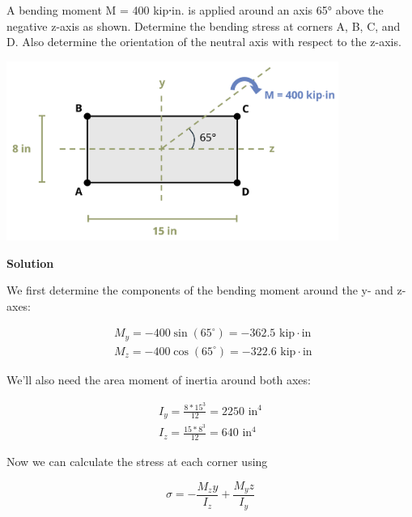 \documentclass[
  letterpaper,
  DIV=11,
  numbers=noendperiod]{scrreprt}
\begin{document}
\begin{tcolorbox}[enhanced jigsaw, colbacktitle=quarto-callout-note-color!10!white, title={Example 9.5: Unsymmetric Bending\,}, coltitle=black, leftrule=.75mm, rightrule=.15mm, opacityback=0, breakable, colframe=quarto-callout-note-color-frame, left=2mm, arc=.35mm, colback=white, bottomrule=.15mm, bottomtitle=1mm, toptitle=1mm, titlerule=0mm, opacitybacktitle=0.6, toprule=.15mm]

A bending moment M = 400 kip⸱in. is applied around an axis 65° above the
negative z-axis as shown. Determine the bending stress at corners A, B,
C, and D. Also determine the orientation of the neutral axis with
respect to the z-axis.

\begin{center}
\includegraphics[width=4.27083in,height=\textheight]{images/CH9 PNGs/Example 9.5 part 1.png}
\end{center}

\textbf{Solution}

We first determine the components of the bending moment around the y-
and z-axes:

\[
\begin{aligned}
& M_y=-400 \sin \left(65^{\circ}\right)=-362.5 \text{ kip} \cdot \text {in } \\
& M_z=-400 \cos \left(65^{\circ}\right)=-322.6 \text{ kip} \cdot \text {in }
\end{aligned}
\]

We'll also need the area moment of inertia around both axes:

\[
\begin{gathered}
I_y=\frac{8 * 15^3}{12}=2250 \text{ in}^4 \\
I_z=\frac{15 * 8^3}{12}=640 \text{ in}^4
\end{gathered}
\]

Now we can calculate the stress at each corner using

\[
\sigma=-\frac{M_z y}{I_z}+\frac{M_y z}{I_y}
\]


\end{tcolorbox}
\end{document}
